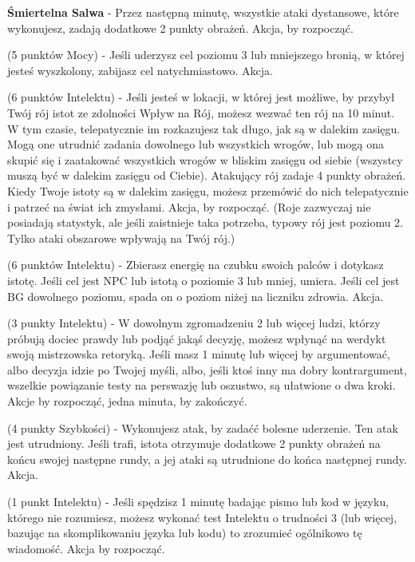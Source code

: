 {\textbf{Śmiertelna Salwa} \label{sec:Śmiertelna Salwa} - Przez następną minutę, wszystkie ataki dystansowe, które wykonujesz, zadają dodatkowe 2 punkty obrażeń. Akcja, by rozpocząć. 

 (5 punktów Mocy) - Jeśli uderzysz cel poziomu 3 lub mniejszego bronią, w której jesteś wyszkolony, zabijasz cel natychmiastowo. Akcja.

 (6 punktów Intelektu) - Jeśli jesteś w lokacji, w której jest możliwe, by przybył Twój rój istot ze zdolności Wpływ na Rój, możesz wezwać ten rój na 10 minut. W tym czasie, telepatycznie im rozkazujesz tak długo, jak są w dalekim zasięgu. Mogą one utrudnić zadania dowolnego lub wszystkich wrogów, lub mogą ona skupić się i zaatakować wszystkich wrogów w bliskim zasięgu od siebie (wszystcy muszą być w dalekim zasięgu od Ciebie). Atakujący rój zadaje 4 punkty obrażeń. Kiedy Twoje istoty są w dalekim zasięgu, możesz przemówić do nich telepatycznie i patrzeć na świat ich zmysłami. Akcja, by rozpocząć. (Roje zazwyczaj nie posiadają statystyk, ale jeśli zaistnieje taka potrzeba, typowy rój jest poziomu 2. Tylko ataki obszarowe wpływają na Twój rój.)

 (6 punktów Intelektu) - Zbierasz energię na czubku swoich palców i dotykasz istotę. Jeśli cel jest NPC lub istotą o poziomie 3 lub mniej, umiera. Jeśli cel jest BG dowolnego poziomu, spada on o poziom niżej na liczniku zdrowia. Akcja.

 (3 punkty Intelektu) - W dowolnym zgromadzeniu 2 lub więcej ludzi, którzy próbują dociec prawdy lub podjąć jakąś decyzję, możesz wpłynąć na werdykt swoją mistrzowska retoryką. Jeśli masz 1 minutę lub więcej by argumentować, albo decyzja idzie po Twojej myśli, albo, jeśli ktoś inny ma dobry kontrargument, wszelkie powiązanie testy na perswazję lub oszustwo, są ułatwione o dwa kroki. Akcje by rozpocząć, jedna minuta, by zakończyć. 

 (4 punkty Szybkości) - Wykonujesz atak, by zadaćć  bolesne uderzenie. Ten atak jest utrudniony. Jeśli trafi, istota otrzymuje dodatkowe 2 punkty obrażeń na końcu swojej następne rundy, a jej ataki są utrudnione do końca następnej rundy. Akcja.

 (1 punkt Intelektu) - Jeśli spędzisz 1 minutę badając pismo lub kod w języku, którego nie rozumiesz, możesz wykonać test Intelektu o trudności 3 (lub więcej, bazując na skomplikowaniu języka lub kodu) to zrozumieć ogólnikowo tę wiadomość. Akcja by rozpocząć. 

}
